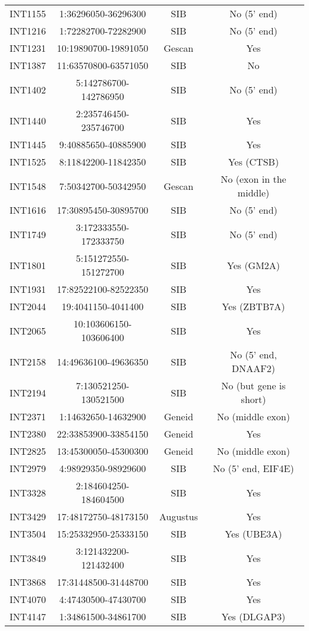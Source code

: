 \begin{table}[h]
\begin{tabular}{lccc}
	INT1155 & 1:36296050-36296300 & SIB & No (5' end) \\
	INT1216 & 1:72282700-72282900 & SIB & No (5' end) \\
	INT1231 & 10:19890700-19891050 & Gescan & Yes \\
	INT1387 & 11:63570800-63571050 & SIB & No \\
	INT1402 & 5:142786700-142786950 & SIB & No (5' end) \\
	INT1440 & 2:235746450-235746700 & SIB & Yes \\
	INT1445 & 9:40885650-40885900 & SIB & Yes \\
	INT1525 & 8:11842200-11842350 & SIB & Yes (CTSB) \\
	INT1548 & 7:50342700-50342950 & Gescan & No (exon in the middle) \\
	INT1616 & 17:30895450-30895700 & SIB & No (5' end) \\
	INT1749 & 3:172333550-172333750 & SIB & No (5' end) \\
	INT1801 & 5:151272550-151272700 & SIB & Yes (GM2A) \\
	INT1931 & 17:82522100-82522350 & SIB & Yes \\
	INT2044 & 19:4041150-4041400 & SIB & Yes (ZBTB7A) \\
	INT2065 & 10:103606150-103606400 & SIB & Yes \\
	INT2158 & 14:49636100-49636350 & SIB & No (5' end, DNAAF2) \\
	INT2194 & 7:130521250-130521500 & SIB & No (but gene is short) \\
	INT2371 & 1:14632650-14632900 & Geneid & No (middle exon) \\
	INT2380 & 22:33853900-33854150 & Geneid & Yes \\
	INT2825 & 13:45300050-45300300 & Geneid & No (middle exon) \\
	INT2979 & 4:98929350-98929600 & SIB & No (5' end, EIF4E) \\
	INT3328 & 2:184604250-184604500 & SIB & Yes \\
	INT3429 & 17:48172750-48173150 & Augustus & Yes \\
	INT3504 & 15:25332950-25333150 & SIB & Yes (UBE3A) \\
	INT3849 & 3:121432200-121432400 & SIB & Yes \\
	INT3868 & 17:31448500-31448700 & SIB & Yes \\
	INT4070 & 4:47430500-47430700 & SIB & Yes \\
	INT4147 & 1:34861500-34861700 & SIB & Yes (DLGAP3)\\

\end{tabular}
\end{table}
